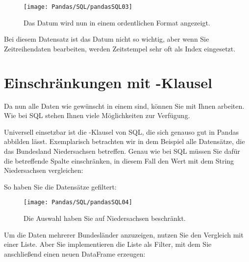 \begin{figure}
	\texttt{[image: Pandas/SQL/pandasSQL03]}
	\caption{Das Datum wird nun in einem ordentlichen Format angezeigt.}
\end{figure}


Bei diesem Datensatz ist das Datum nicht so wichtig, aber wenn Sie Zeitreihendaten bearbeiten, werden Zeitstempel sehr oft als Index eingesetzt.

\section{Einschränkungen mit -Klausel}

Da nun alle Daten wie gewünscht in einem  sind, können Sie mit Ihnen arbeiten. Wie bei SQL stehen Ihnen viele Möglichkeiten zur Verfügung.

Universell einsetzbar ist die -Klausel von SQL, die sich genauso gut in Pandas abbilden lässt. Exemplarisch betrachten wir in dem Beispiel alle Datensätze, die das Bundesland Niedersachsen betreffen. Genau wie bei SQL müssen Sie dafür die betreffende Spalte einschränken, in diesem Fall den Wert mit dem String Niedersachsen vergleichen:

\medskip



\medskip

So haben Sie die Datensätze gefiltert:

\begin{figure}
	\texttt{[image: Pandas/SQL/pandasSQL04]}
	\caption{Die Auswahl haben Sie auf Niedersachsen beschränkt.}
\end{figure}


Um die Daten mehrerer Bundesländer anzuzeigen, nutzen Sie den Vergleich mit einer Liste. Aber Sie implementieren die Liste als Filter, mit dem Sie anschließend einen neuen DataFrame erzeugen:

\medskip




\medskip

